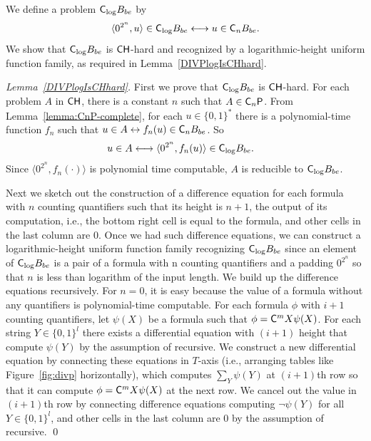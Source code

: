 We define a problem $\mathsf{C}_{\log} B_{be}$ by
\begin{equation}
 \langle 0^{2^n}, u \rangle \in \mathsf{C}_{\log} B_{be}
 \longleftrightarrow
 u \in \mathsf{C}_n B_{be}.
\end{equation}
We show that $\mathsf{C}_{\log} B_{be}$ 
is $\mathsf{CH}$-hard and recognized by a logarithmic-height uniform function family,
as required in Lemma~\ref{DIVPlogIsCHhard}. 

\begin{proof}[Lemma~\ref{DIVPlogIsCHhard}]
First we prove that $\mathsf{C}_{\log} B_{be}$ is $\mathsf{CH}$-hard.
For each problem $A$ in $\mathsf{CH}$, there is a constant $n$ such that $A \in \mathsf{C}_n \mathsf{P}$.
From Lemma~\ref{lemma:CnP-complete}, for each $u \in \{0,1\}^*$
there is a polynomial-time function $f_n$ such that
$u \in A \leftrightarrow f_n(u) \in \mathsf{C}_n B_{be}$. So
\begin{align}
 u \in A 
 & \longleftrightarrow \langle 0^{2^n}, f_n(u) \rangle \in \mathsf{C}_{\log} B_{be}.
\end{align}
Since $\langle 0^{2^n}, f_n(\cdot) \rangle$ is polynomial time computable,
$A$ is reducible to $\mathsf{C}_{\log} B_{be}$.

Next we sketch out the construction of
a difference equation for each formula with $n$ counting quantifiers
such that its height is $n+1$,
the output of its computation, i.e., 
the bottom right cell is equal to the formula,
and other cells in the last column are $0$.
Once we had such difference equations,
we can construct a logarithmic-height uniform function family
recognizing $\mathsf{C}_{\log} B_{be}$ 
since an element of $\mathsf{C}_{\log} B_{be}$ is a pair of a formula with n counting quantifiers
and a padding $0^{2^n}$ so that $n$ is less than logarithm of the input length.
We build up the difference equations recursively.
For $n = 0$, it is easy because
the value of a formula without any quantifiers is
polynomial-time computable.
For each formula $\phi$ with $i+1$ counting quantifiers,
let $\psi(X)$ be a formula such that $\phi = \mathsf{C}^m X \psi(X)$.
For each string $Y \in \{0,1\}^{l}$
there exists a differential equation with $(i+1)$ height 
that compute $\psi(Y)$ by the assumption of recursive.
We construct a new differential equation by connecting these equations in $T$-axis
(i.e., arranging tables like Figure~\ref{fig:divp} horizontally),
which computes $\sum_Y \psi(Y)$ at $(i+1)$th row
so that it can compute $\phi = \mathsf{C}^m X \psi(X)$ at the next row.
We cancel out the value in $(i+1)$th row by connecting difference equations computing $\neg \psi(Y)$ for all $Y \in \{0, 1\}^l$,
and other cells in the last column are $0$ by the assumption of recursive.
\qed
\end{proof}


